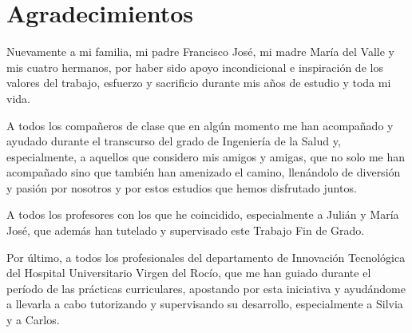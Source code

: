\chapter*{Agradecimientos}

Nuevamente a mi familia, mi padre Francisco José, mi madre María del Valle y mis cuatro hermanos, por haber sido apoyo incondicional e inspiración de los valores del trabajo, esfuerzo y sacrificio durante mis años de estudio y toda mi vida.

A todos los compañeros de clase que en algún momento me han acompañado y ayudado durante el transcurso del grado de Ingeniería de la Salud y, especialmente, a aquellos que considero mis amigos y amigas, que no solo me han acompañado sino que también han amenizado el camino, llenándolo de diversión y pasión por nosotros y por estos estudios que hemos disfrutado juntos.

A todos los profesores con los que he coincidido, especialmente a Julián y María José, que además han tutelado y supervisado este Trabajo Fin de Grado.

Por último, a todos los profesionales del departamento de Innovación Tecnológica del Hospital Universitario Virgen del Rocío, que me han guiado durante el período de las prácticas curriculares, apostando por esta iniciativa y ayudándome a llevarla a cabo tutorizando y supervisando su desarrollo, especialmente a Silvia y a Carlos.
